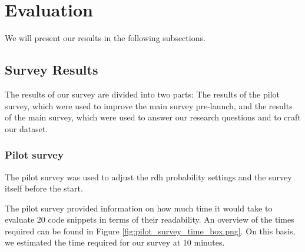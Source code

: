 \documentclass[%
class=scrreprt,
chapterprefix=false,%
open=right,%
twoside=false,%
paper=a4,%
logofile={Logo\_zentral\_farbig\_EN.png},%
thesistype=master,%
UKenglish,%
]{se2thesis}
\theoremstyle{definition}
\begin{document}
	
\section{Evaluation} \label{Evaluation}
	We will present our results in the following subsections.

\subsection{Survey Results} \label{Survey Results}
	The results of our survey are divided into two parts: The results of the pilot survey, which were used to improve the main survey pre-launch, and the results of the main survey, which were used to answer our research questions and to craft our dataset.
	
\subsubsection{Pilot survey} \label{Pilot Survey}
	The pilot survey was used to adjust the rdh probability settings and the survey itself before the start.

	The pilot survey provided information on how much time it would take to evaluate 20 code snippets in terms of their readability. An overview of the times required can be found in Figure \ref{fig:pilot_survey_time_box.png}. On this basis, we estimated the time required for our survey at 10 minutes.
	
\end{document}
